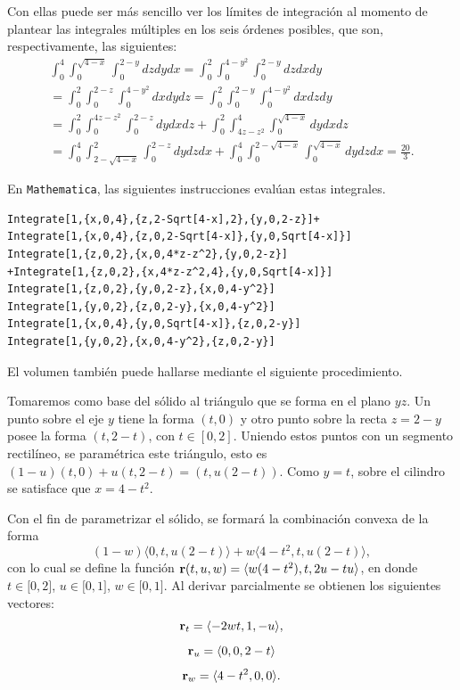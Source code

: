 Con ellas puede ser más sencillo ver los límites de integración al momento de plantear las integrales múltiples en los seis órdenes posibles, que son, respectivamente, las siguientes:
\begin{multline*}
  \int_{0}^{4}\int_{0}^{\sqrt{4-x}}\int_{0}^{2-y}dzdydx= \int_{0}^{2}\int_{0}^{4-y^{2}}\int_{0}^{2-y}dzdxdy\\
  =\int_{0}^{2}\int_{0}^{2-z}\int_{0}^{4-y^{2}}dxdydz= \int_{0}^{2}\int_{0}^{2-y}\int_{0}^{4-y^{2}}dxdzdy\\
  =\int_{0}^{2}\int_{0}^{4z-z^{2}}\int_{0}^{2-z}dydxdz+\int_{0}^{2}%
  \int_{4z-z^{2}}^{4}\int_{0}^{\sqrt{4-x}}dydxdz \\
  = \int_{0}^{4}\int_{2-\sqrt{4-x}}^{2}\int_{0}^{2-z}dydzdx+\int_{0}^{4}%
  \int_{0}^{2-\sqrt{4-x}}\int_{0}^{\sqrt{4-x}}dydzdx= \frac{20}{3}.
\end{multline*}

En \verb"Mathematica", las siguientes instrucciones evalúan estas integrales.

\begin{tcolorbox}[title=\bf Instrucción en \verb"Mathematica"]\begin{Verbatim}[formatcom=\letraverbatim]
Integrate[1,{x,0,4},{z,2-Sqrt[4-x],2},{y,0,2-z}]+
Integrate[1,{x,0,4},{z,0,2-Sqrt[4-x]},{y,0,Sqrt[4-x]}]
Integrate[1,{z,0,2},{x,0,4*z-z^2},{y,0,2-z}]
+Integrate[1,{z,0,2},{x,4*z-z^2,4},{y,0,Sqrt[4-x]}]
Integrate[1,{z,0,2},{y,0,2-z},{x,0,4-y^2}]
Integrate[1,{y,0,2},{z,0,2-y},{x,0,4-y^2}]
Integrate[1,{x,0,4},{y,0,Sqrt[4-x]},{z,0,2-y}]
Integrate[1,{y,0,2},{x,0,4-y^2},{z,0,2-y}]
\end{Verbatim}
\end{tcolorbox}

El volumen también puede hallarse mediante el siguiente procedimiento.

Tomaremos como base del sólido al triángulo que se forma en el plano $yz$. Un punto sobre el eje $y$ tiene la forma $(t,0) $ y otro punto sobre la recta $z=2-y$ posee la forma $(t,2-t)$, con $t \in [0,2]$.
Uniendo estos puntos con un segmento rectilíneo, se paramétrica este triángulo, esto es $(1-u)(t,0) +u(t,2-t)=(t,u(2-t))$.
Como $y=t$, sobre el cilindro se satisface que $x=4-t^2$.

Con el fin de parametrizar el sólido, se formará la combinación convexa de la forma
\[(1-w) \langle 0,t,u( 2-t)\rangle +w\langle 4-t^{2},t,u( 2-t) \rangle,\]
con lo cual se define la función
${\bf r}( t,u,w) = \langle w( 4-t^{2}),t,2u-tu\rangle $,
en donde $t\in \lbrack 0,2]$, $u\in \lbrack 0,1]$, $w\in \lbrack 0,1]$.
Al derivar parcialmente se obtienen los siguientes vectores:
\[{\bf r}_{t} = \langle -2wt,1,-u\rangle,\]
\[{\bf r}_{u} = \langle 0,0,2-t\rangle\]
\[{\bf r}_{w} = \langle 4-t^{2},0,0\rangle.\]

